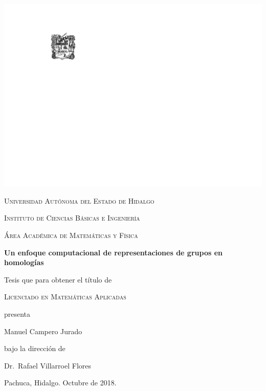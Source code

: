 \documentclass[12pt]{book}
\theoremstyle{definition}
\newcounter{in}
\newcommand{\elespacio}{1.4cm}
\begin{document}
\mainmatter 
\begin{titlepage}
  \begin{center}
    \null
    \vspace*{\fill}

    \includegraphics[scale=1.2,bb=55 20 0 0]{escudouaeh.pdf}

    \vspace*{\elespacio}

    \textsc{Universidad Autónoma del Estado de Hidalgo}

    \textsc{Instituto de Ciencias Básicas e Ingeniería}

    \textsc{Área Académica de Matemáticas y Física}

    \vspace*{\elespacio}

    {\Huge\bfseries Un enfoque computacional de representaciones de
      grupos en homologías\par}

    \vspace*{\elespacio}

    {\large Tesis que para obtener el título de}

    \vspace*{\elespacio}

    {\Large\textsc{Licenciado en Matemáticas Aplicadas}}

    \vspace*{\elespacio}

    {\large presenta}

    \vspace*{\elespacio}

    {\Huge Manuel Campero Jurado}

    \vspace*{\elespacio}

    {\large bajo la dirección de}

    \bigskip

    {\Large Dr.~Rafael Villarroel Flores}

    \bigskip

    {Pachuca, Hidalgo. Octubre de 2018.}

    \vspace*{\fill}

  \end{center}
\end{titlepage}
\end{document}
